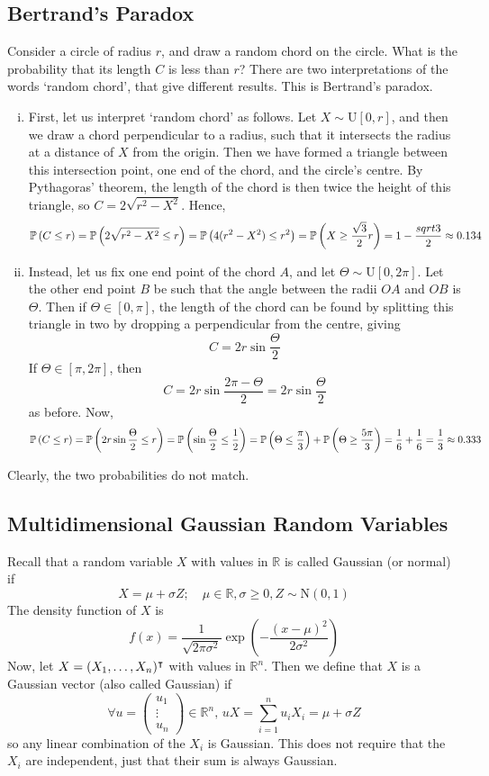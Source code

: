 \documentclass{article}
\begin{document}
\subsection{Bertrand's Paradox}
Consider a circle of radius $r$, and draw a random chord on the circle. What is the probability that its length $C$ is less than $r$? There are two interpretations of the words `random chord', that give different results. This is Bertrand's paradox.
\begin{enumerate}[(i)]
	\item First, let us interpret `random chord' as follows. Let $X \sim \mathrm{U}[0, r]$, and then we draw a chord perpendicular to a radius, such that it intersects the radius at a distance of $X$ from the origin. Then we have formed a triangle between this intersection point, one end of the chord, and the circle's centre. By Pythagoras' theorem, the length of the chord is then twice the height of this triangle, so $C = 2\sqrt{r^2 - X^2}$. Hence,
	      \[ \mathbb{P}\left({C \leq r}\right) = \mathbb{P}\left({2\sqrt{r^2 - X^2} \leq r}\right) = \mathbb{P}\left({4(r^2 - X^2) \leq r^2}\right) = \mathbb{P}\left({X \geq \frac{\sqrt{3}}{2}r}\right) = 1 - \frac{sqrt 3}{2} \approx 0.134 \]
	\item Instead, let us fix one end point of the chord $A$, and let $\Theta \sim \mathrm{U}[0, 2\pi]$. Let the other end point $B$ be such that the angle between the radii $OA$ and $OB$ is $\Theta$. Then if $\Theta \in [0, \pi]$, the length of the chord can be found by splitting this triangle in two by dropping a perpendicular from the centre, giving
	      \[ C = 2r\sin\frac{\Theta}{2} \]
	      If $\Theta \in [\pi, 2\pi]$, then
	      \[ C = 2r\sin\frac{2\pi - \Theta}{2} = 2r\sin\frac{\Theta}{2} \]
	      as before.
	      Now,
	      \[ \mathbb{P}\left({C \leq r}\right) = \mathbb{P}\left({2r\sin\frac{\Theta}{2} \leq r}\right) = \mathbb{P}\left({\sin\frac{\Theta}{2} \leq \frac{1}{2}}\right) = \mathbb{P}\left({\Theta \leq \frac{\pi}{3}}\right) + \mathbb{P}\left({\Theta \geq \frac{5\pi}{3}}\right) = \frac{1}{6} + \frac{1}{6} = \frac{1}{3} \approx 0.333 \]
\end{enumerate}
Clearly, the two probabilities do not match.

\subsection{Multidimensional Gaussian Random Variables}
Recall that a random variable $X$ with values in $\mathbb R$ is called Gaussian (or normal) if
\[ X = \mu + \sigma Z;\quad \mu \in \mathbb R, \sigma \geq 0, Z \sim \mathrm{N}(0, 1) \]
The density function of $X$ is
\[ f(x) = \frac{1}{\sqrt{2\pi\sigma^2}} \exp(-\frac{(x-\mu)^2}{2\sigma^2}) \]
Now, let $X = (X_1, \dots, X_n)^\intercal$ with values in $\mathbb R^n$. Then we define that $X$ is a Gaussian vector (also called Gaussian) if
\[ \forall u = \begin{pmatrix}
		u_1 \\ \vdots \\ u_n
	\end{pmatrix} \in \mathbb R^n,\, uX = \sum_{i=1}^n u_i X_i = \mu + \sigma Z \]
so any linear combination of the $X_i$ is Gaussian. This does not require that the $X_i$ are independent, just that their sum is always Gaussian.
\end{document}
